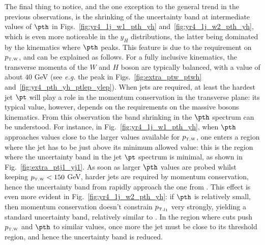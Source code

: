 The final thing to notice, and the one exception to the general trend
in the previous observations, is the shrinking of the uncertainty band
at intermediate values of $\pth$ in Figs.~\ref{fig:yr4_1j_w1_pth_yh}
and~\ref{fig:yr4_1j_w2_pth_yh}, which is even more noticeable in the
$y_H$ distributions, the latter being dominated by the kinematics
where $\pth$ peaks. This feature is due to the requirement on $p_{\scriptscriptstyle \mathrm{T,W}}$,
and can be explained as follows. For a fully inclusive kinematics, the
transverse momenta of the $W$ and $H$ boson are typically balanced,
with a value of about $40$ GeV (see \emph{e.g.} the peak in
Figs.~\ref{fig:extra_ptw_ptwh}
and~\ref{fig:yr4_pth_yh_ptlep_ylep}). When jets are required, at least
the hardest jet $\pt$ will play a role in the momentum conservation in
the transverse plane: its typical value, however, depends on the
requirements on the massive bosons kinematics. From this observation
the band shrinking in the $\pth$ spectrum can be understood. For
instance, in Fig.~\ref{fig:yr4_1j_w1_pth_yh}, when $\pth$ approaches
values close to the larger values available for $p_{\scriptscriptstyle \mathrm{T,W}}$, one enters a
region where the jet has to be just above its minimum allowed value:
this is the region where the uncertainty band in the jet $\pt$
spectrum is minimal, as shown in Fig.~\ref{fig:extra_ptj1_yj1}. As
soon as larger $\pth$ values are probed whilst keeping $p_{\scriptscriptstyle \mathrm{T,W}}<150$ GeV,
harder jets are required by momentum conservation, hence the
uncertainty band from \HVNNLOPS{} rapidly approach the one from
\HWJMINLO{}.  This effect is even more evident in
Fig.~\ref{fig:yr4_1j_w2_pth_yh}: if $\pth$ is relatively small, then
momentum conservation doesn't constrain $p_{\scriptscriptstyle \mathrm{T,j_{1}}}$ very strongly,
yielding a standard uncertainty band, relatively similar to
\HWJMINLO{}. In the region where cuts push $p_{\scriptscriptstyle \mathrm{T,W}}$ and $\pth$ to
similar values, once more the jet must be close to its threshold
region, and hence the uncertainty band is reduced.

